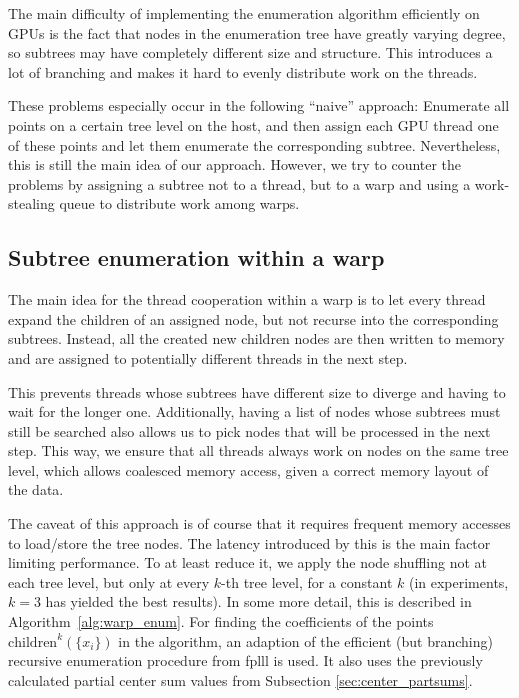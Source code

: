 \documentclass{scrartcl}
\begin{document}
    The main difficulty of implementing the enumeration algorithm efficiently on GPUs is the fact that nodes in the enumeration tree have greatly varying degree, so subtrees may have completely different size and structure. This introduces a lot of branching and makes it hard to evenly distribute work on the threads.

    These problems especially occur in the following ``naive'' approach: Enumerate all points on a certain tree level on the host, and then assign each GPU thread one of these points and let them enumerate the corresponding subtree.
    Nevertheless, this is still the main idea of our approach. However, we try to counter the problems by assigning a subtree not to a thread, but to a warp and using a work-stealing queue to distribute work among warps.

    \subsection{Subtree enumeration within a warp}

    The main idea for the thread cooperation within a warp is to let every thread expand the children of an assigned node, but not recurse into the corresponding subtrees. Instead, all the created new children nodes are then written to memory and are assigned to potentially different threads in the next step.

    This prevents threads whose subtrees have different size to diverge and having to wait for the longer one. Additionally, having a list of nodes whose subtrees must still be searched also allows us to pick nodes that will be processed in the next step. This way, we ensure that all threads always work on nodes on the same tree level, which allows coalesced memory access, given a correct memory layout of the data.

    The caveat of this approach is of course that it requires frequent memory accesses to load/store the tree nodes. The latency introduced by this is the main factor limiting performance. To at least reduce it, we apply the node shuffling not at each tree level, but only at every $k$-th tree level, for a constant $k$ (in experiments, $k = 3$ has yielded the best results).
    In some more detail, this is described in Algorithm~\ref{alg:warp_enum}. For finding the coefficients of the points $\mathrm{children}^k(\{x_i\})$ in the algorithm, an adaption of the efficient (but branching) recursive enumeration procedure from fplll is used. It also uses the previously calculated partial center sum values from Subsection \ref{sec:center_partsums}.
\end{document}
